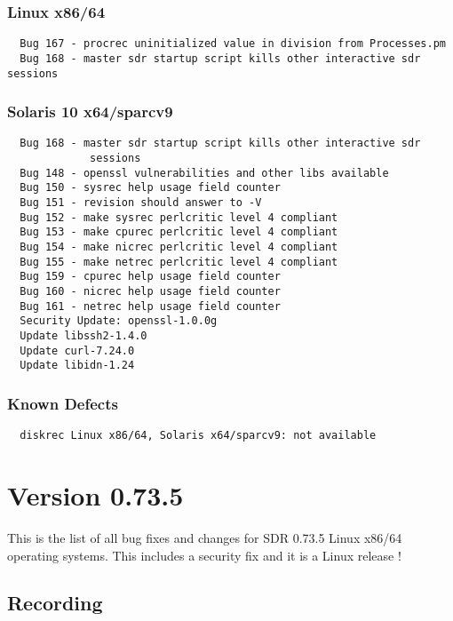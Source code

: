 \subsubsection*{Linux x86/64}
\begin{verbatim}
  Bug 167 - procrec uninitialized value in division from Processes.pm
  Bug 168 - master sdr startup script kills other interactive sdr
sessions

\end{verbatim}

\subsubsection*{Solaris 10 x64/sparcv9}
\begin{verbatim}
  Bug 168 - master sdr startup script kills other interactive sdr
             sessions
  Bug 148 - openssl vulnerabilities and other libs available
  Bug 150 - sysrec help usage field counter
  Bug 151 - revision should answer to -V
  Bug 152 - make sysrec perlcritic level 4 compliant
  Bug 153 - make cpurec perlcritic level 4 compliant
  Bug 154 - make nicrec perlcritic level 4 compliant
  Bug 155 - make netrec perlcritic level 4 compliant
  Bug 159 - cpurec help usage field counter
  Bug 160 - nicrec help usage field counter
  Bug 161 - netrec help usage field counter
  Security Update: openssl-1.0.0g
  Update libssh2-1.4.0
  Update curl-7.24.0
  Update libidn-1.24
\end{verbatim}

\subsubsection*{Known Defects}
\begin{verbatim}
  diskrec Linux x86/64, Solaris x64/sparcv9: not available
\end{verbatim}



\section{Version 0.73.5}
\noindent
This is the list of all bug fixes and changes for SDR 0.73.5 Linux x86/64
operating systems. This includes a security fix and it is a Linux release !

\subsection*{Recording}

